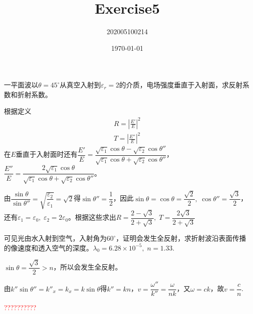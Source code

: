\documentclass{mynote}
\title{Exercise5}
\author{202005100214}
\date\today
\begin{document}
\maketitle
\begin{exercise}{4.2}
一平面波以$\theta = 45^{\circ}$从真空入射到$\varepsilon_r= 2$的介质，电场强度垂直于入射面，求反射系数和折射系数。
\end{exercise}
\begin{solution}
根据定义
\begin{gather*}
    R = \left| \frac{E'}{E} \right|^2 \\
    T = \left| \frac{E''}{E} \right|^2
\end{gather*}
在$E$垂直于入射面时还有$\dfrac{E'}{E} = \dfrac{\sqrt{\varepsilon_1} \cos \theta - \sqrt{\varepsilon_2}\cos \theta''}{\sqrt{\varepsilon_1} \cos \theta + \sqrt{\varepsilon_2}\cos \theta''}$，$\dfrac{E''}{E} = \dfrac{2 \sqrt{\varepsilon_1} \cos \theta}{\sqrt{\varepsilon_1} \cos \theta + \sqrt{\varepsilon_2} \cos \theta''}$。

由$\dfrac{\sin \theta}{\sin \theta''} = \sqrt{\dfrac{\varepsilon_2}{\varepsilon_1}} = \sqrt{2}$得$\sin \theta'' = \dfrac{1}{2}$，因此$\sin \theta = \cos \theta = \dfrac{\sqrt{2}}{2},\; \cos \theta'' = \dfrac{\sqrt{3}}{2}$，还有$\varepsilon_1 = \varepsilon_0,\; \varepsilon_2 = 2\varepsilon_0$。根据这些求出$R = \dfrac{2 - \sqrt{3}}{2 + \sqrt{3}},\; T = \dfrac{2\sqrt{3}}{2 + \sqrt{3}}$
\end{solution}








\begin{exercise}{4.3}
可见光由水入射到空气，入射角为$60^{\circ}$，证明会发生全反射，求折射波沿表面传播的像速度和透入空气的深度。$\lambda_0 = 6.28\times 10^{-5},\; n=1.33$.
\end{exercise}
\begin{solution}
$\sin \theta  = \dfrac{\sqrt{3}}{2} > n$，所以会发生全反射。

由$k''\sin \theta'' = k''_x = k_x = k \sin \theta$得$k'' = kn$，$v = \dfrac{\omega ''}{k ''} = \dfrac{\omega}{nk}$，又$\omega = ck$，故$v = \dfrac{c}{n}$.

\textcolor{red}{??????????}
\end{solution}
\end{document}

